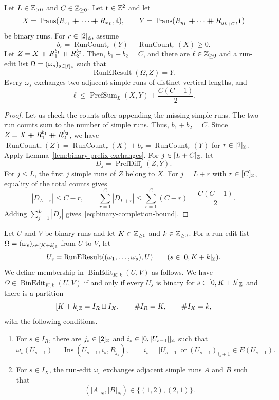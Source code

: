 \begin{lemma}\label{lem:binary-completion}
Let $L\in\mathbb Z_{>0}$ and $C\in\mathbb Z_{\ge0}$.
Let $\mathbf t\in\mathbb Z^2$ and let
\[
 X=\operatorname{Trans}(R_{x_1}\ccn \cdots\ccn R_{x_L},\mathbf t),\qquad
 Y=\operatorname{Trans}(R_{y_1}\ccn \cdots\ccn R_{y_{L+C}},\mathbf t)
\]
be binary runs.
For $r\in[2]_{\mathbb Z}$, assume
\[
 b_r=\operatorname{RunCount}_r(Y)-\operatorname{RunCount}_r(X)\ge0.
\]
Let $Z=X\mathbin{+\mkern-10mu+} R_1^{b_1}\mathbin{+\mkern-10mu+} R_2^{b_2}$.
Then, $b_1+b_2=C$, and there are $\ell\in\mathbb Z_{\ge0}$ and a run-edit list $\Omega=(\omega_s)_{s\in[\ell]_{\mathbb Z}}$ such that
\[
 \operatorname{RunEResult}(\Omega,Z)=Y.
\]
Every $\omega_s$ exchanges two adjacent simple runs of distinct vertical lengths, and
\begin{equation}\label{eq:binary-completion-bound}
 \ell\le\operatorname{PrefSum}_L(X,Y)+\frac{C(C-1)}2.
\end{equation}
\end{lemma}
\begin{proof}
Let us check the counts after appending the missing simple runs.
The two run counts sum to the number of simple runs. Thus, $b_1+b_2=C$.
Since $Z=X\mathbin{+\mkern-10mu+} R_1^{b_1}\mathbin{+\mkern-10mu+} R_2^{b_2}$, we have
$\operatorname{RunCount}_r(Z)=\operatorname{RunCount}_r(X)+b_r=\operatorname{RunCount}_r(Y)$ for $r\in[2]_{\mathbb Z}$.
Apply Lemma~\ref{lem:binary-prefix-exchanges}.
For $j\in[L+C]_{\mathbb Z}$, let
\[
 D_j=\operatorname{PrefDiff}_j(Z,Y).
\]
For $j\le L$, the first $j$ simple runs of $Z$ belong to $X$.
For $j=L+r$ with $r\in[C]_{\mathbb Z}$, equality of the total counts gives
\[
 |D_{L+r}|\le C-r,\qquad
 \sum_{r=1}^{C}|D_{L+r}|\le\sum_{r=1}^{C}(C-r)=\frac{C(C-1)}2.
\]
Adding $\sum_{j=1}^L|D_j|$ gives~\eqref{eq:binary-completion-bound}.
\end{proof}

\begin{definition}\label{def:binary-run-edit-lists}
Let $U$ and $V$ be binary runs and let $K\in\mathbb Z_{\ge0}$ and $k\in\mathbb Z_{\ge0}$.
For a run-edit list $\Omega=(\omega_s)_{s\in[K+k]_{\mathbb Z}}$ from $U$ to $V$, let
\[
 U_s=\operatorname{RunEResult}((\omega_1,\ldots,\omega_s),U)
 \qquad(s\in[0,K+k]_{\mathbb Z}).
\]
We define membership in $\operatorname{BinEdit}_{K,k}(U,V)$ as follows.
We have $\Omega\in\operatorname{BinEdit}_{K,k}(U,V)$ if and only if every $U_s$ is binary for $s\in[0,K+k]_{\mathbb Z}$ and there is a partition
\[
 [K+k]_{\mathbb Z}=I_R\sqcup I_X,\qquad \#I_R=K,\qquad \#I_X=k,
\]
with the following conditions.
\begin{enumerate}[font=\itshape]
\item For $s\in I_R$, there are $j_s\in[2]_{\mathbb Z}$ and $i_s\in[0,|U_{s-1}|]_{\mathbb Z}$ such that
\[
 \omega_s(U_{s-1})=\operatorname{Ins}(U_{s-1},i_s,R_{j_s}),\qquad
 i_s=|U_{s-1}|\ \text{or}\ (U_{s-1})_{i_s+1}\in E(U_{s-1}).
\]
\item For $s\in I_X$, the run-edit $\omega_s$ exchanges adjacent simple runs $A$ and $B$ such that
\[
 (|A|_N,|B|_N)\in\{(1,2),(2,1)\}.
\]
\end{enumerate}
\end{definition}

